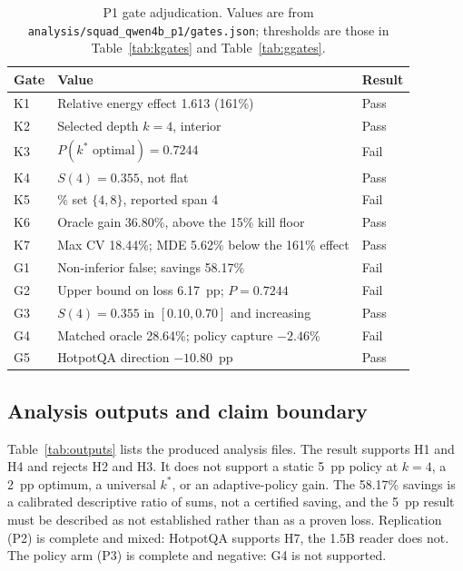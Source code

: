 \documentclass[a4paper,fleqn]{cas-sc}
\begin{document}
\begin{table}[pos=htbp]
  \centering
  \caption{P1 gate adjudication. Values are from
  \texttt{analysis/squad\_qwen4b\_p1/gates.json}; thresholds are those in
  Table~\ref{tab:kgates} and Table~\ref{tab:ggates}.}
  \label{tab:p1gates}
  \small
  \setlength{\tabcolsep}{4pt}
  \begin{tabularx}{\textwidth}{>{\raggedright\arraybackslash}p{0.9cm}>{\raggedright\arraybackslash}p{8.6cm}>{\raggedright\arraybackslash}X}
    \toprule
    \textbf{Gate} & \textbf{Value} & \textbf{Result} \\
    \midrule
    K1 & Relative energy effect 1.613 (161\%) & Pass \\
    K2 & Selected depth $k=4$, interior & Pass \\
    K3 & $P(k^{*}\text{ optimal})=0.7244$ & Fail \\
    K4 & $S(4)=0.355$, not flat & Pass \\
    K5 & 95\% set $\{4,8\}$, reported span 4 & Fail \\
    K6 & Oracle gain 36.80\%, above the 15\% kill floor & Pass \\
    K7 & Max CV 18.44\%; MDE 5.62\% below the 161\% effect & Pass \\
    G1 & Non-inferior false; savings 58.17\% & Fail \\
    G2 & Upper bound on loss 6.17~pp; $P=0.7244$ & Fail \\
    G3 & $S(4)=0.355$ in $[0.10,0.70]$ and increasing & Pass \\
    G4 & Matched oracle 28.64\%; policy capture $-2.46\%$ & Fail \\
    G5 & HotpotQA direction $-10.80$~pp & Pass \\
    \bottomrule
  \end{tabularx}
\end{table}

\subsection{Analysis outputs and claim boundary}

Table~\ref{tab:outputs} lists the produced analysis files. The result supports H1 and H4 and
rejects H2 and H3. It does not support a static 5~pp policy at $k=4$, a 2~pp optimum, a universal
$k^{*}$, or an adaptive-policy gain. The 58.17\% savings is a calibrated descriptive ratio of
sums, not a certified saving, and the 5~pp result must be described as not established rather
than as a proven loss. Replication (P2) is complete and mixed: HotpotQA supports H7, the 1.5B
reader does not. The policy arm (P3) is complete and negative: G4 is not supported.
\end{document}
